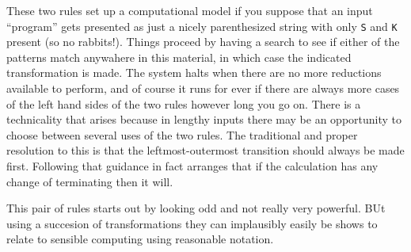 These two rules set up a computational model if you suppose that an input
``program'' gets presented as just a nicely parenthesized string with only
\verb+S+ and \verb+K+ present (so no rabbits!). Things proceed by having
a search to see if either of the patterns match anywahere in this material,
in which case the indicated transformation is made. The system halts when
there are no more reductions available to perform, and of course it runs
for ever if there are always more cases of the left hand sides of the two
rules however long you go on. There is a technicality that arises because in
lengthy inputs there may be an opportunity to choose between several uses
of the two rules. The traditional and proper resolution to this is that the
leftmost-outermost transition should always be made first. Following that
guidance in fact arranges that if the calculation has any change of
terminating then it will.

This pair of rules starts out by looking odd and not really very powerful.
BUt using a succesion of transformations they can implausibly easily be
shows to relate to sensible computing using reasonable notation.

